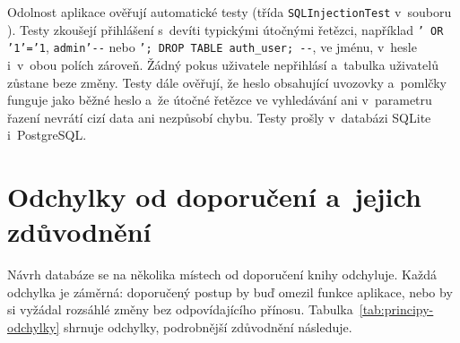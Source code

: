 Odolnost aplikace ověřují automatické testy (třída \texttt{SQLInjectionTest} v~souboru ). Testy zkoušejí přihlášení s~devíti typickými útočnými řetězci, například \texttt{' OR '1'='1}, \texttt{admin'-{}-} nebo \texttt{'; DROP TABLE auth\_user; -{}-}, ve jménu, v~hesle i~v~obou polích zároveň. Žádný pokus uživatele nepřihlásí a~tabulka uživatelů zůstane beze změny. Testy dále ověřují, že heslo obsahující uvozovky a~pomlčky funguje jako běžné heslo a~že útočné řetězce ve vyhledávání ani v~parametru řazení nevrátí cizí data ani nezpůsobí chybu. Testy prošly v~databázi SQLite i~PostgreSQL.

\section{Odchylky od doporučení a~jejich zdůvodnění}\label{sec:principy-odchylky}

Návrh databáze se na několika místech od doporučení knihy odchyluje. Každá odchylka je záměrná: doporučený postup by buď omezil funkce aplikace, nebo by si vyžádal rozsáhlé změny bez odpovídajícího přínosu. Tabulka~\ref{tab:principy-odchylky} shrnuje odchylky, podrobnější zdůvodnění následuje.

